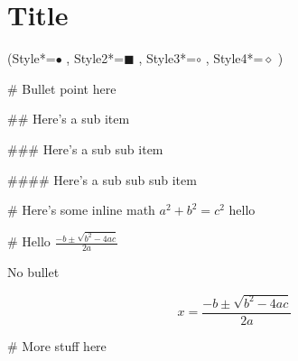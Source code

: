 \documentclass[11pt, oneside]{article}
\begin{document}
\section*{Title}

\begin{easylist}[itemize]
\ListProperties(Style*=$\bullet$ , Style2*=\tiny$\blacksquare$ , Style3*=$\circ$ , Style4*=$\diamond$ )

# Bullet point here

## Here's a sub item

### Here's a sub sub item

#### Here's a sub sub sub item

# Here's some inline math $a^2 + b^2 = c^2$ hello

# Hello {\LARGE $\frac{-b \pm \sqrt{b^{2} - 4ac}}{2a}$}

No bullet

\[
    x = \frac{-b \pm \sqrt{b^{2} - 4ac}}{2a}
\]

# More stuff here



\end{easylist}
\end{document}
